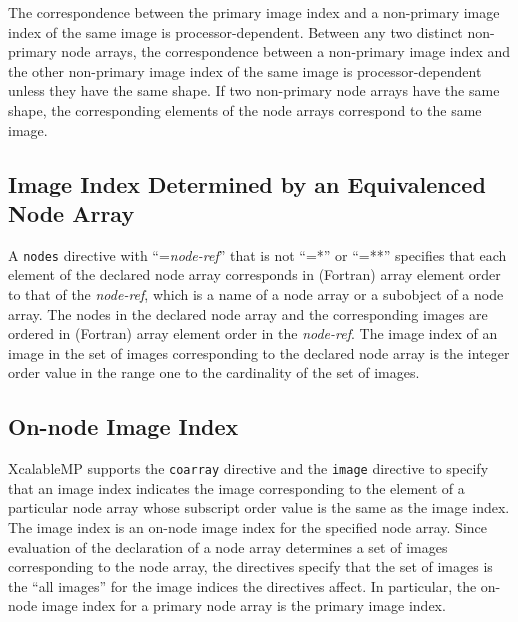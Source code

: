 The correspondence between the primary image index and a non-primary image
index of the same image is processor-dependent.
Between any two distinct non-primary node arrays, 
the correspondence between a non-primary image index 
and the other non-primary image index of the same image is
processor-dependent unless they have the same shape. 
If two non-primary node arrays have the same shape,
the corresponding elements of the node arrays correspond
to the same image.


%


\subsection{Image Index Determined by an Equivalenced Node Array}

A {\tt nodes} directive with ``={\it node-ref}'' that is not ``=*'' or ``=**''
specifies that
each element of the declared node array corresponds in (Fortran) array
element order
to that of the {\it node-ref},
which is a name of a node array or a subobject of a node array.
The nodes in the declared node array and the corresponding images 
are ordered in (Fortran) array element order in the {\it node-ref}.
The image index of an image in the set of images
corresponding to the declared node array
is the integer order value in the range one to the cardinality of the set of images.


\subsection{On-node Image Index}

XcalableMP supports the {\tt coarray} directive and the {\tt image}
directive to 
specify that an image index indicates the image corresponding to
the element of a particular node array whose subscript order value is 
the same as the image index.
The image index is an on-node image index for the specified node array. 
Since evaluation of the declaration of a node array 
determines a set of images corresponding to the node array,
the directives specify that the set of images 
is the ``all images'' for the image indices the directives affect.
In particular, the on-node image index for a primary node array
is the primary image index. 



